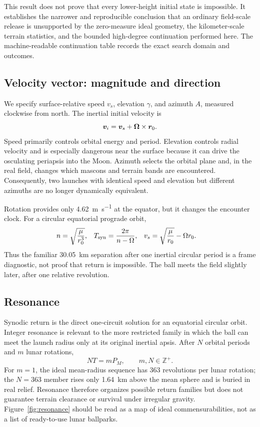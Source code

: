 This result does not prove that every lower-height initial state is
impossible. It establishes the narrower and reproducible conclusion that an
ordinary field-scale release is unsupported by the zero-measure ideal
geometry, the kilometer-scale terrain statistics, and the bounded
high-degree continuation performed here. The machine-readable continuation
table records the exact search domain and outcomes.

\subsection{Velocity vector: magnitude and direction}

We specify surface-relative speed \(v_s\), elevation \(\gamma\), and
azimuth \(A\), measured clockwise from north. The inertial initial velocity is
\begin{equation}
 \bm{v}_i=\bm{v}_s+\bm{\Omega}\times\bm{r}_0.
\label{eq:rotation_velocity_v2}
\end{equation}
Speed primarily controls orbital energy and period. Elevation controls radial
velocity and is especially dangerous near the surface because it can drive the
osculating periapsis into the Moon. Azimuth selects the orbital plane and, in
the real field, changes which mascons and terrain bands are encountered.
Consequently, two launches with identical speed and elevation but different
azimuths are no longer dynamically equivalent.

Rotation provides only \SI{4.62}{\metre\per\second} at the equator, but it changes the
encounter clock. For a circular equatorial prograde orbit,
\begin{align}
 n&=\sqrt{\frac{\mu}{r_0^3}},&
 T_{\rm syn}&=\frac{2\pi}{n-\Omega},&
 v_s&=\sqrt{\frac{\mu}{r_0}}-\Omega r_0.
\label{eq:synodic_v2}
\end{align}
Thus the familiar \SI{30.05}{km} separation after one inertial circular period
is a frame diagnostic, not proof that return is impossible. The ball meets the
field slightly later, after one relative revolution.

\subsection{Resonance}

Synodic return is the direct one-circuit solution for an equatorial circular
orbit. Integer resonance is relevant to the more restricted family in which
the ball can meet the launch radius only at its original inertial apsis. After
\(N\) orbital periods and \(m\) lunar rotations,
\begin{equation}
 NT=mP_M,\qquad m,N\in\mathbb Z^+.
\label{eq:resonance_v2}
\end{equation}
For \(m=1\), the ideal mean-radius sequence has 363 revolutions per lunar
rotation; the \(N=363\) member rises only \SI{1.64}{km} above the mean sphere
and is buried in real relief. Resonance therefore organizes possible return
families but does not guarantee terrain clearance or survival under irregular
gravity. Figure~\ref{fig:resonance} should be read as a map of ideal
commensurabilities, not as a list of ready-to-use lunar ballparks.


